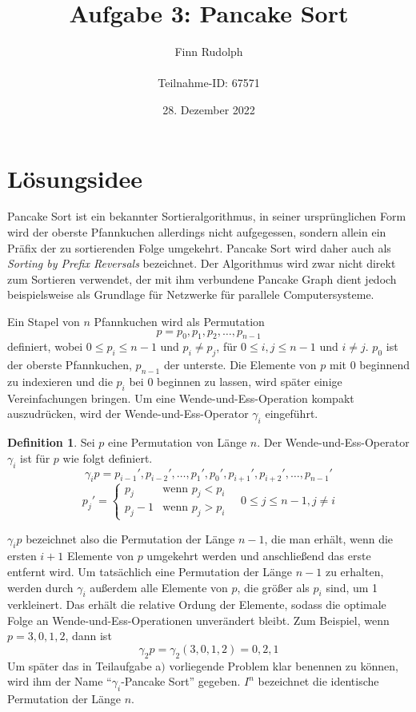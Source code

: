 \documentclass[a4paper, 11pt, ngerman]{article}
\title{\LARGE \textbf{Aufgabe 3: Pancake Sort}}
\author{\large Finn Rudolph \\ \\ \large Teilnahme-ID: 67571}
\date{\large 28. Dezember 2022}
\begin{document}
\begin{titlepage}
    \maketitle
    \tableofcontents
    \thispagestyle{empty}
\end{titlepage}

\newtheorem{theorem}{Satz}
\newtheorem{lemma}{Lemma}
\theoremstyle{definition}
\newtheorem{definition}{Definition}

\section{Lösungsidee}

Pancake Sort ist ein bekannter Sortieralgorithmus, in seiner ursprünglichen Form wird der oberste Pfannkuchen allerdings nicht aufgegessen, sondern allein ein Präfix der zu sortierenden Folge umgekehrt. Pancake Sort wird daher auch als \emph{Sorting by Prefix Reversals} bezeichnet. Der Algorithmus wird zwar nicht direkt zum Sortieren verwendet, der mit ihm verbundene Pancake Graph dient jedoch beispielsweise als Grundlage für Netzwerke für parallele Computersysteme.

Ein Stapel von $n$ Pfannkuchen wird als Permutation
$$
    p = p_0, p_1, p_2, \dots, p_{n - 1}
$$
definiert, wobei $0 \le p_i \le n-1$ und $p_i \ne p_j$, für $0 \le i, j \le n-1$ und $i \ne j$. $p_0$ ist der oberste Pfannkuchen, $p_{n - 1}$ der unterste. Die Elemente von $p$ mit 0 beginnend zu indexieren und die $p_i$ bei 0 beginnen zu lassen, wird später einige Vereinfachungen bringen. Um eine Wende-und-Ess-Operation kompakt auszudrücken, wird der Wende-und-Ess-Operator $\gamma_i$ eingeführt.

\begin{definition}
    Sei $p$ eine Permutation von Länge $n$. Der Wende-und-Ess-Operator $\gamma_i$ ist für $p$ wie folgt definiert.
    $$
        \gamma_i p = p_{i-1}', p_{i-2}', \dots, p_1', p_0', p_{i+1}', p_{i+2}', \dots, p_{n-1}'
    $$
    $$
        p_j' = \begin{cases}
            p_j     & \text{wenn } p_j < p_i \\
            p_j - 1 & \text{wenn } p_j > p_i
        \end{cases}
        \quad 0 \le j \le n - 1, j \ne i
    $$
\end{definition}
$\gamma_i p$ bezeichnet also die Permutation der Länge $n - 1$, die man erhält, wenn die ersten $i+1$ Elemente von $p$ umgekehrt werden und anschließend das erste entfernt wird. Um tatsächlich eine Permutation der Länge $n - 1$ zu erhalten, werden durch $\gamma_i$ außerdem alle Elemente von $p$, die größer als $p_i$ sind, um 1 verkleinert. Das erhält die relative Ordung der Elemente, sodass die optimale Folge an Wende-und-Ess-Operationen unverändert bleibt. Zum Beispiel, wenn $p = 3, 0, 1, 2$, dann ist
$$
    \gamma_2 p = \gamma_2 (3, 0, 1, 2) = 0, 2, 1
$$
Um später das in Teilaufgabe a$)$ vorliegende Problem klar benennen zu können, wird ihm der Name ``$\gamma_i$-Pancake Sort'' gegeben. $I^n$ bezeichnet die identische Permutation der Länge $n$.
\end{document}
